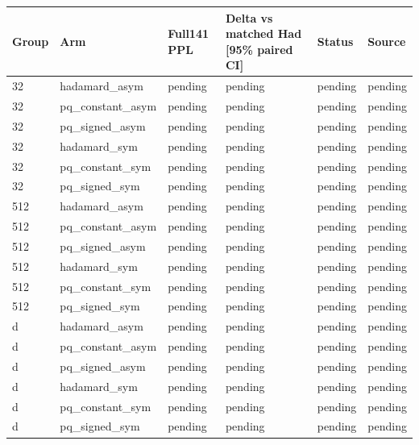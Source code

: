 \begin{tabular}{llllll}
\toprule
Group & Arm & Full141 PPL & Delta vs matched Had [95\% paired CI] & Status & Source \\
\midrule
32 & hadamard\_asym & pending & pending & pending & pending \\
32 & pq\_constant\_asym & pending & pending & pending & pending \\
32 & pq\_signed\_asym & pending & pending & pending & pending \\
32 & hadamard\_sym & pending & pending & pending & pending \\
32 & pq\_constant\_sym & pending & pending & pending & pending \\
32 & pq\_signed\_sym & pending & pending & pending & pending \\
512 & hadamard\_asym & pending & pending & pending & pending \\
512 & pq\_constant\_asym & pending & pending & pending & pending \\
512 & pq\_signed\_asym & pending & pending & pending & pending \\
512 & hadamard\_sym & pending & pending & pending & pending \\
512 & pq\_constant\_sym & pending & pending & pending & pending \\
512 & pq\_signed\_sym & pending & pending & pending & pending \\
d & hadamard\_asym & pending & pending & pending & pending \\
d & pq\_constant\_asym & pending & pending & pending & pending \\
d & pq\_signed\_asym & pending & pending & pending & pending \\
d & hadamard\_sym & pending & pending & pending & pending \\
d & pq\_constant\_sym & pending & pending & pending & pending \\
d & pq\_signed\_sym & pending & pending & pending & pending \\
\bottomrule
\end{tabular}

